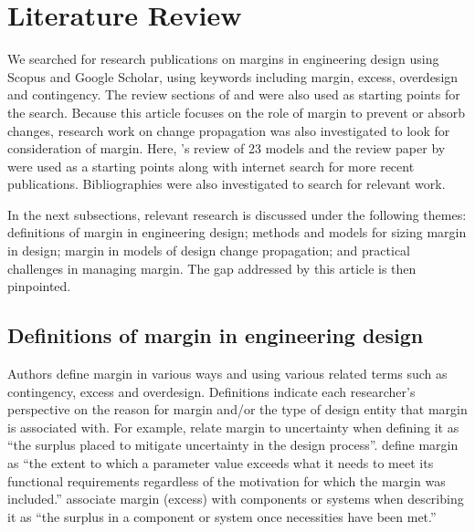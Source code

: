 \section{Literature Review} \label{existingmodels}

We searched for research publications on margins in engineering design using Scopus and Google Scholar, using keywords including margin, excess, overdesign and contingency. The review sections of \cite{Eckert2017} and \cite{lebjioui2018} were also used as starting points for the search. Because this article focuses on the role of margin to prevent or absorb changes, research work on change propagation was also investigated to look for consideration of margin. Here, \cite{Ahmad2013}'s review of 23 models and the review paper by \cite{hamraz2013} were used as a starting points along with internet search for more recent publications. Bibliographies were also investigated to search for relevant work.

In the next subsections, relevant research is discussed under the following themes: definitions of margin in engineering design; methods and models for sizing margin in design; margin in models of design change propagation; and practical challenges in managing margin. The gap addressed by this article is then pinpointed.

\subsection{Definitions of margin in engineering design}\label{margindefinitions}

Authors define margin in various ways and using various related terms such as contingency, excess and overdesign. Definitions indicate each researcher's perspective on the reason for margin and/or the type of design entity that margin is associated with. For example, \citet{Thunnissen2004b} relate margin to uncertainty when defining it as ``the surplus placed to mitigate uncertainty in the design process''. \cite{Eckert2012} define margin as ``the extent to which a parameter value exceeds what it needs to meet its functional requirements regardless of the motivation for which the margin was included.'' \cite{Cansler2016} associate margin (excess) with components or systems when describing it as ``the surplus in a component or system once necessities have been met.'' 
  
